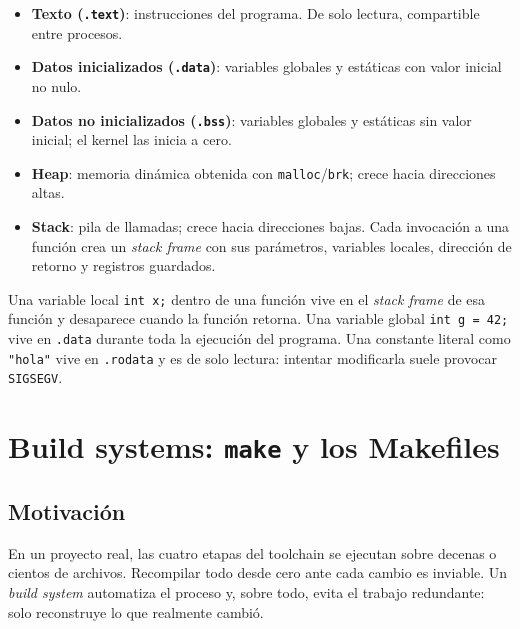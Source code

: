 \documentclass[11pt,a4paper]{article}
\begin{document}
\begin{itemize}[leftmargin=*]
    \item \textbf{Texto (\texttt{.text})}: instrucciones del
        programa. De solo lectura, compartible entre procesos.
    \item \textbf{Datos inicializados (\texttt{.data})}: variables
        globales y estáticas con valor inicial no nulo.
    \item \textbf{Datos no inicializados (\texttt{.bss})}: variables
        globales y estáticas sin valor inicial; el kernel las inicia
        a cero.
    \item \textbf{Heap}: memoria dinámica obtenida con
        \texttt{malloc}/\texttt{brk}; crece hacia direcciones altas.
    \item \textbf{Stack}: pila de llamadas; crece hacia direcciones
        bajas. Cada invocación a una función crea un \emph{stack
        frame} con sus parámetros, variables locales, dirección de
        retorno y registros guardados.
\end{itemize}

\begin{idea}
Una variable local \texttt{int x;} dentro de una función vive en el
\emph{stack frame} de esa función y desaparece cuando la función
retorna. Una variable global \texttt{int g = 42;} vive en
\texttt{.data} durante toda la ejecución del programa. Una constante
literal como \texttt{"hola"} vive en \texttt{.rodata} y es de solo
lectura: intentar modificarla suele provocar \texttt{SIGSEGV}.
\end{idea}

\section{Build systems: \texttt{make} y los Makefiles}

\subsection{Motivación}

En un proyecto real, las cuatro etapas del toolchain se ejecutan
sobre decenas o cientos de archivos. Recompilar todo desde cero ante
cada cambio es inviable. Un \emph{build system} automatiza el proceso
y, sobre todo, evita el trabajo redundante: solo reconstruye lo que
realmente cambió.
\end{document}
